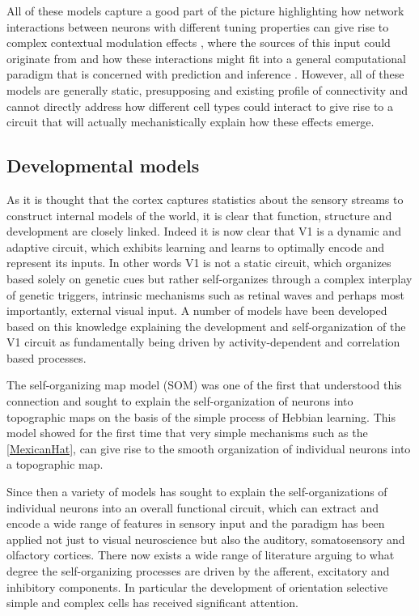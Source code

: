 All of these models capture a good part of the picture highlighting
how network interactions between neurons with different tuning
properties can give rise to complex contextual modulation effects
\citep{Li2002}, where the sources of this input could originate from
\citep{Schwabe2006} and how these interactions might fit into a
general computational paradigm that is concerned with prediction and
inference \citep{Spratling2010, Coen2015}. However, all of these
models are generally static, presupposing and existing profile of
connectivity and cannot directly address how different cell types
could interact to give rise to a circuit that will actually
mechanistically explain how these effects emerge.

\subsection{Developmental models} \label{devmodels}

As it is thought that the cortex captures statistics about the sensory
streams to construct internal models of the world, it is clear that
function, structure and development are closely linked. Indeed it is
now clear that V1 is a dynamic and adaptive circuit, which exhibits
learning and learns to optimally encode and represent its inputs. In
other words V1 is not a static circuit, which organizes based solely
on genetic cues but rather self-organizes through a complex interplay
of genetic triggers, intrinsic mechanisms such as retinal waves and
perhaps most importantly, external visual input. A number of models
have been developed based on this knowledge explaining the development
and self-organization of the V1 circuit as fundamentally being driven
by activity-dependent and correlation based processes.

The self-organizing map model (SOM) \citep{VonderMalsburg1973} was one
of the first that understood this connection and sought to explain the
self-organization of neurons into topographic maps on the basis of the
simple process of Hebbian learning. This model showed for the first
time that very simple mechanisms such as the \ref{MexicanHat}, can
give rise to the smooth organization of individual neurons into a
topographic map.

Since then a variety of models has sought to explain the
self-organizations of individual neurons into an overall functional
circuit, which can extract and encode a wide range of features in
sensory input and the paradigm has been applied not just to visual
neuroscience but also the auditory, somatosensory and olfactory
cortices. There now exists a wide range of literature arguing to what
degree the self-organizing processes are driven by the afferent,
excitatory and inhibitory components. In particular the development of
orientation selective simple and complex cells has received
significant attention.

